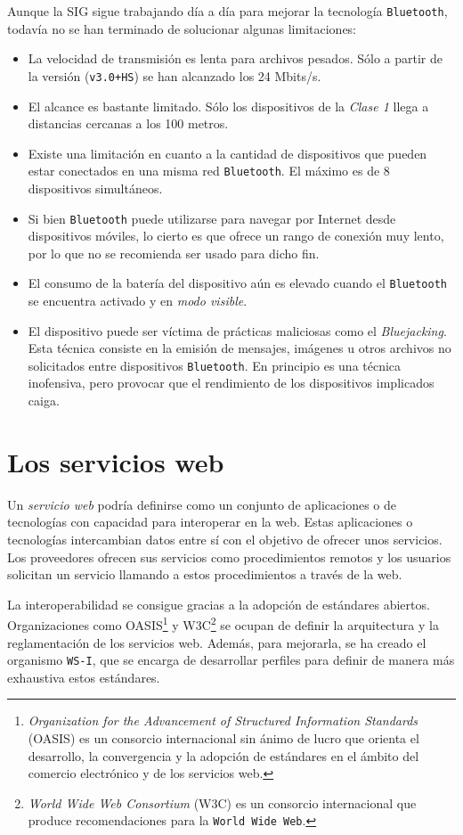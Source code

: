 Aunque la \acs{SIG} sigue trabajando día a día para mejorar la tecnología
\texttt{Bluetooth}, todavía no se han terminado de solucionar algunas
limitaciones:
\begin{itemize}
\item La velocidad de transmisión es lenta para archivos pesados. Sólo a
partir de la versión (\texttt{v3.0+HS}) se han alcanzado los 24 Mbits/s.
\item El alcance es bastante limitado. Sólo los dispositivos de la
\emph{Clase 1} llega a distancias cercanas a los 100 metros.
\item Existe una limitación en cuanto a la cantidad de dispositivos que pueden
estar conectados en una misma red \texttt{Bluetooth}. El máximo es de 8
dispositivos simultáneos.
\item Si bien \texttt{Bluetooth} puede utilizarse para navegar por Internet desde
dispositivos móviles, lo cierto es que ofrece un rango de conexión muy lento,
por lo que no se recomienda ser usado para dicho fin.
\item El consumo de la batería del dispositivo aún es elevado cuando el
\texttt{Bluetooth} se encuentra activado y en \emph{modo visible}.
\item El dispositivo puede ser víctima de prácticas maliciosas como el
\emph{Bluejacking}. Esta técnica consiste en la emisión de mensajes, imágenes
u otros archivos no solicitados entre dispositivos \texttt{Bluetooth}. En
principio es una técnica inofensiva, pero provocar que el rendimiento de los
dispositivos implicados caiga.
\end{itemize}


  \section{Los servicios web}

Un \emph{servicio web} podría definirse como un conjunto de aplicaciones o de 
tecnologías con capacidad para interoperar en la web. Estas aplicaciones o
tecnologías intercambian datos entre sí con el objetivo de ofrecer unos
servicios. Los proveedores ofrecen sus servicios como procedimientos remotos
y los usuarios solicitan un servicio llamando a estos procedimientos a través
de la web.

La interoperabilidad se consigue gracias a la adopción de estándares abiertos.
Organizaciones como \acs{OASIS}\footnote{\emph{Organization for the Advancement
of Structured Information Standards} (\acs{OASIS}) es un consorcio
internacional sin ánimo de lucro que orienta el desarrollo, la convergencia y
la adopción de estándares en el ámbito del comercio electrónico y de los
servicios web.} y \acs{W3C}\footnote{\emph{World Wide Web Consortium}
(\acs{W3C}) es un consorcio internacional que produce recomendaciones para la
\texttt{World Wide Web}.} se ocupan de definir la arquitectura y la
reglamentación de los servicios web. Además, para mejorarla, se ha creado el
organismo \texttt{WS-I}, que se encarga de desarrollar perfiles para definir
de manera más exhaustiva estos estándares.

